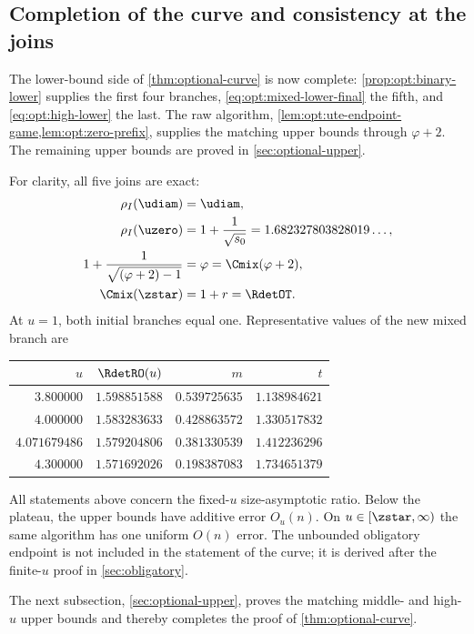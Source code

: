 \subsection{Completion of the curve and consistency at the joins}

The lower-bound side of \cref{thm:optional-curve} is now complete:
\cref{prop:opt:binary-lower} supplies the first four branches,
\cref{eq:opt:mixed-lower-final} the fifth, and
\cref{eq:opt:high-lower} the last.  The raw algorithm,
\cref{lem:opt:ute-endpoint-game,lem:opt:zero-prefix}, supplies the matching
upper bounds through $\varphi+2$.  The remaining upper bounds are proved in
\cref{sec:optional-upper}.

For clarity, all five joins are exact:
\begin{align*}
 \rho_I(\udiam)&=\udiam,\\
 \rho_I(\uzero)&=1+\frac1{\sqrt{s_0}}
              =1.682327803828019\ldots,\\
 1+\frac1{\sqrt{(\varphi+2)-1}}&=\varphi
              =\Cmix(\varphi+2),\\
 \Cmix(\zstar)&=1+r=\RdetOT.
\end{align*}
At $u=1$, both initial branches equal one.  Representative values of the
new mixed branch are
\begin{center}
\begin{tabular}{@{}rrrr@{}}
\toprule
$u$ & $\RdetRO(u)$ & $m$ & $t$\\
\midrule
$3.800000$ & $1.598851588$ & $0.539725635$ & $1.138984621$\\
$4.000000$ & $1.583283633$ & $0.428863572$ & $1.330517832$\\
$4.071679486$ & $1.579204806$ & $0.381330539$ & $1.412236296$\\
$4.300000$ & $1.571692026$ & $0.198387083$ & $1.734651379$\\
\bottomrule
\end{tabular}
\end{center}

\begin{remark}
\label{rem:opt:curve-audit}
All statements above concern the fixed-$u$ size-asymptotic ratio.  Below the
plateau, the upper bounds have additive error $O_u(n)$.  On
$u\in[\zstar,\infty)$ the same algorithm has one uniform $O(n)$ error.  The
unbounded obligatory endpoint is not included in the statement of the
curve; it is derived after the finite-$u$ proof in
\cref{sec:obligatory}.
\end{remark}

The next subsection, \cref{sec:optional-upper}, proves the matching
middle- and high-$u$ upper bounds and thereby completes the proof of
\cref{thm:optional-curve}.
